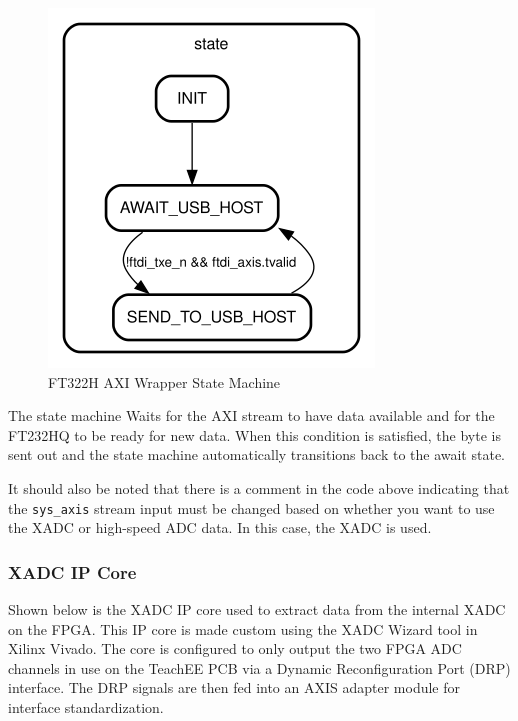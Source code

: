 \documentclass[letterpaper,11pt]{article}
\newcommand{\code}[1]{\texttt{#1}}
\begin{document}
\begin{figure}[H]
  \centering
  \includegraphics[width=\textwidth/3]{figures/ft232h-state-machine.png}
  \caption{FT322H AXI Wrapper State Machine}
  \label{fig:ft232h-state-machine}
\end{figure}

The state machine Waits for the AXI stream to have data available and for the
FT232HQ to be ready for new data. When this condition is satisfied, the byte is
sent out and the state machine automatically transitions back to the await
state.

It should also be noted that there is a comment in the code above indicating
that the \code{sys_axis} stream input must be changed based on whether you want
to use the XADC or high-speed ADC data. In this case, the XADC is used.

\subsubsection{XADC IP Core}
Shown below is the XADC IP core used to extract data from the internal XADC on
the FPGA. This IP core is made custom using the XADC Wizard tool in Xilinx
Vivado. The core is configured to only output the two FPGA ADC channels in use
on the TeachEE PCB via a Dynamic Reconfiguration Port (DRP) interface. The DRP
signals are then fed into an AXIS adapter module for interface standardization.
\end{document}
